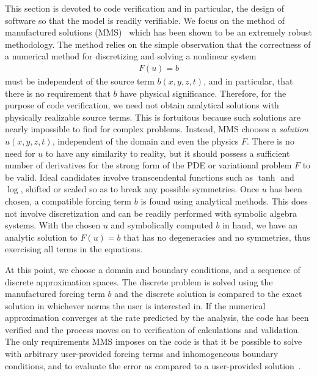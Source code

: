This section is devoted to code verification and in particular, the design of software so that the model is readily verifiable.
We focus on the method of manufactured solutions (MMS)~\citep{roache2002cvm} which has been shown to be an extremely robust methodology.
The method relies on the simple observation that the correctness of a numerical method for discretizing and solving a nonlinear system
\begin{align*}
  F(u) = b
\end{align*}
must be independent of the source term $b(x,y,z,t)$, and in particular, that there is no requirement that $b$ have physical significance.
Therefore, for the purpose of code verification, we need not obtain analytical solutions with physically realizable source terms.
This is fortuitous because such solutions are nearly impossible to find for complex problems.
Instead, MMS chooses a \emph{solution} $u(x,y,z,t)$, independent of the domain and even the physics $F$.
There is no need for $u$ to have any similarity to reality, but it should possess a sufficient number of derivatives for the strong form of the PDE or variational problem $F$ to be valid.
Ideal candidates involve transcendental functions such as $\tanh$ and $\log$, shifted or scaled so as to break any possible symmetries.
Once $u$ has been chosen, a compatible forcing term $b$ is found using analytical methods.
This does not involve discretization and can be readily performed with symbolic algebra systems.
With the chosen $u$ and symbolically computed $b$ in hand, we have an analytic solution to $F(u) = b$ that has no degeneracies and no symmetries, thus exercising all terms in the equations.

At this point, we choose a domain and boundary conditions, and a sequence of discrete approximation spaces.
The discrete problem is solved using the manufactured forcing term $b$ and the discrete solution is compared to the exact solution in whichever norms the user is interested in.
If the numerical approximation converges at the rate predicted by the analysis, the code has been verified and the process moves on to verification of calculations and validation.
The only requirements MMS imposes on the code is that it be possible to solve with arbitrary user-provided forcing terms and inhomogeneous boundary conditions, and to evaluate the error as compared to a user-provided solution~\citep{roache2004bpc}.

